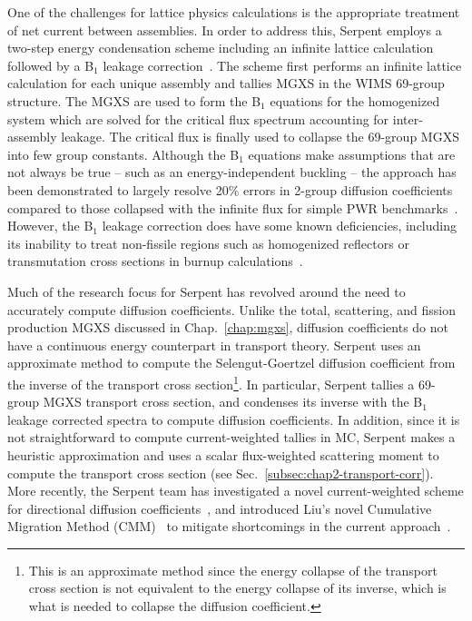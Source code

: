 One of the challenges for lattice physics calculations is the appropriate treatment of net current between assemblies. In order to address this, Serpent employs a two-step energy condensation scheme including an infinite lattice calculation followed by a B$_{1}$ leakage correction~\cite{fridman2011serpent}. The scheme first performs an infinite lattice calculation for each unique assembly and tallies \ac{MGXS} in the WIMS 69-group structure. The \ac{MGXS} are used to form the B$_{1}$ equations for the homogenized system which are solved for the critical flux spectrum accounting for inter-assembly leakage. The critical flux is finally used to collapse the 69-group \ac{MGXS} into few group constants. Although the B$_{1}$ equations make assumptions that are not always be true -- such as an energy-independent buckling -- the approach has been demonstrated to largely resolve 20\% errors in 2-group diffusion coefficients compared to those collapsed with the infinite flux for simple \ac{PWR} benchmarks~\cite{fridman2011serpent}. However, the B$_{1}$ leakage correction does have some known deficiencies, including its inability to treat non-fissile regions such as homogenized reflectors or transmutation cross sections in burnup calculations~\cite{leppanen2016overview}.

Much of the research focus for Serpent has revolved around the need to accurately compute diffusion coefficients. Unlike the total, scattering, and fission production \ac{MGXS} discussed in Chap.~\ref{chap:mgxs}, diffusion coefficients do not have a continuous energy counterpart in transport theory. Serpent uses an approximate method to compute the Selengut-Goertzel diffusion coefficient from the inverse of the transport cross section\footnote{This is an approximate method since the energy collapse of the transport cross section is not equivalent to the energy collapse of its inverse, which is what is needed to collapse the diffusion coefficient.}. In particular, Serpent tallies a 69-group \ac{MGXS} transport cross section, and condenses its inverse with the B$_{1}$ leakage corrected spectra to compute diffusion coefficients. In addition, since it is not straightforward to compute current-weighted tallies in \ac{MC}, Serpent makes a heuristic approximation and uses a scalar flux-weighted scattering moment to compute the transport cross section (see Sec.~\ref{subsec:chap2-transport-corr}). More recently, the Serpent team has investigated a novel current-weighted scheme for directional diffusion coefficients~\cite{dorval2015diff}, and introduced Liu's novel Cumulative Migration Method (CMM)~\cite{liuphysor2016} to mitigate shortcomings in the current approach~\cite{leppanen2016overview}.

